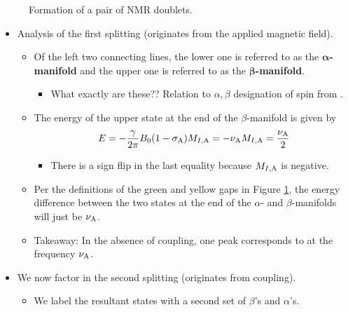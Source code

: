 \documentclass[../notes.tex]{subfiles}
\begin{document}
\begin{itemize}
\begin{figure}[h!]
        \caption{Formation of a pair of NMR doublets.}
        \label{fig:NMRpairDoublets}
    \end{figure}
    \begin{itemize}
        \item Analysis of the first splitting (originates from the applied magnetic field).
        \begin{itemize}
            \item Of the left two connecting lines, the lower one is referred to as the \textbf{$\bm{\alpha}$-manifold} and the upper one is referred to as the \textbf{$\bm{\beta}$-manifold}.
            \begin{itemize}
                \item What exactly are these?? Relation to $\alpha,\beta$ designation of spin from \textcite{bib:CHEM26100Notes}.
            \end{itemize}
            \item The energy of the upper state at the end of the $\beta$-manifold is given by
            \begin{equation*}
                E = -\frac{\gamma}{2\pi}B_0(1-\sigma_{\ce{A}})M_{I,\ce{A}}
                = -\nu_{\ce{A}}M_{I,\ce{A}}
                = \frac{\nu_{\ce{A}}}{2}
            \end{equation*}
            \begin{itemize}
                \item There is a sign flip in the last equality because $M_{I,\ce{A}}$ is negative.
            \end{itemize}
            \item Per the definitions of the green and yellow gaps in Figure \ref{fig:NMRpairDoublets}, the energy difference between the two states at the end of the $\alpha$- and $\beta$-manifolds will just be $\nu_{\ce{A}}$.
            \item Takeaway: In the absence of coupling, one peak corresponds to  at the frequency $\nu_{\ce{A}}$.
        \end{itemize}
        \item We now factor in the second splitting (originates from coupling).
        \begin{itemize}
            \item We label the resultant states with a second set of $\beta$'s and $\alpha$'s.
            \begin{itemize}

\end{itemize}
\end{itemize}
\end{itemize}
\end{itemize}
\end{document}

